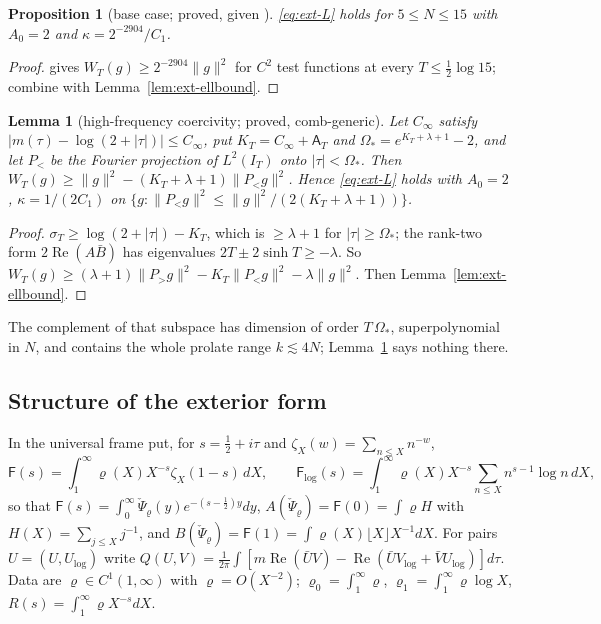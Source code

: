 \documentclass[11pt]{amsart}
\newtheorem{proposition}[theorem]{Proposition}
\newtheorem{lemma}[theorem]{Lemma}
\theoremstyle{definition}
\theoremstyle{remark}
\newcommand{\Rel}{\operatorname{Re}}
\newcommand{\IT}{I_T}
\newcommand{\sT}{\sigma_T}
\newcommand{\Aconst}{\mathsf A_T}
\begin{document}
\begin{proposition}[base case; proved, given \cite{Mori15}]\label{prop:ext-base}
\eqref{eq:ext-L} holds for $5\le N\le15$ with $A_0=2$ and $\kappa=2^{-2904}/C_1$.
\end{proposition}
\begin{proof}
\cite{Mori15} gives $W_T(g)\ge2^{-2904}\|g\|^2$ for $C^2$ test functions at every $T\le\frac12\log15$; combine with
Lemma~\ref{lem:ext-ellbound}.
\end{proof}

\begin{lemma}[high-frequency coercivity; proved, comb-generic]\label{lem:ext-hf}
Let $C_\infty$ satisfy $|m(\tau)-\log(2+|\tau|)|\le C_\infty$, put $K_T=C_\infty+\Aconst$ and $\Omega_*=e^{K_T+\lambda+1}-2$, and
let $P_<$ be the Fourier projection of $L^2(\IT)$ onto $|\tau|<\Omega_*$. Then $W_T(g)\ge\|g\|^2-(K_T+\lambda+1)\|P_<g\|^2$.
Hence \eqref{eq:ext-L} holds with $A_0=2$, $\kappa=1/(2C_1)$ on $\{g:\|P_<g\|^2\le\|g\|^2/(2(K_T+\lambda+1))\}$.
\end{lemma}
\begin{proof}
$\sT\ge\log(2+|\tau|)-K_T$, which is $\ge\lambda+1$ for $|\tau|\ge\Omega_*$; the rank-two form $2\Rel(A\bar B)$ has eigenvalues
$2T\pm2\sinh T\ge-\lambda$. So $W_T(g)\ge(\lambda+1)\|P_>g\|^2-K_T\|P_<g\|^2-\lambda\|g\|^2$. Then Lemma~\ref{lem:ext-ellbound}.
\end{proof}

The complement of that subspace has dimension of order $T\,\Omega_*$, superpolynomial in $N$, and contains the whole
prolate range $k\lesssim4N$; Lemma~\ref{lem:ext-hf} says nothing there.

\subsection{Structure of the exterior form}\label{subsec:ext-struct}

In the universal frame put, for $s=\frac12+i\tau$ and $\zeta_X(w)=\sum_{n\le X}n^{-w}$,
\[
\mathsf F(s)=\int_1^\infty\varrho(X)X^{-s}\zeta_X(1-s)\,dX,\qquad
\mathsf F_{\log}(s)=\int_1^\infty\varrho(X)X^{-s}\sum_{n\le X}n^{s-1}\log n\,dX,
\]
so that $\mathsf F(s)=\int_0^\infty\check\Psi_\varrho(y)e^{-(s-\frac12)y}dy$, $A(\check\Psi_\varrho)=\mathsf F(0)=\int\varrho H$ with
$H(X)=\sum_{j\le X}j^{-1}$, and $B(\check\Psi_\varrho)=\mathsf F(1)=\int\varrho(X)\lfloor X\rfloor X^{-1}dX$. For pairs $U=(U,U_{\log})$ write
$Q(U,V)=\frac1{2\pi}\int[m\Rel(\bar UV)-\Rel(\bar UV_{\log}+\bar VU_{\log})]d\tau$. Data are $\varrho\in C^1(1,\infty)$ with
$\varrho=O(X^{-2})$; $\varrho_0=\int_1^\infty\varrho$, $\varrho_1=\int_1^\infty\varrho\log X$, $R(s)=\int_1^\infty\varrho X^{-s}dX$.
\end{document}
